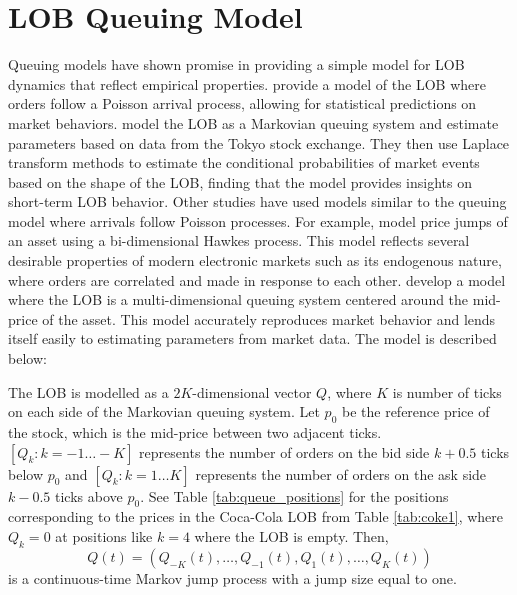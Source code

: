 \section{LOB Queuing Model} \label{modelLOB}
Queuing models have shown promise in providing a simple model for LOB dynamics that reflect empirical properties. \cite{A6a} provide a model of the LOB where orders follow a Poisson arrival process, allowing for statistical predictions on market behaviors. \cite{A6b} model the LOB as a Markovian queuing system and estimate parameters based on data from the Tokyo stock exchange. They then use Laplace transform methods to estimate the conditional probabilities of market events based on the shape of the LOB, finding that the model provides insights on short-term LOB behavior. Other studies have used models similar to the queuing model where arrivals follow Poisson processes. For example, \cite{A9} model price jumps of an asset using a bi-dimensional Hawkes process. This model reflects several desirable properties of modern electronic markets such as its endogenous nature, where orders are correlated and made in response to each other. \cite{A6} develop a model where the LOB is a multi-dimensional queuing system centered around the mid-price of the asset. This model accurately reproduces market behavior and lends itself easily to estimating parameters from market data. The model is described below:

The LOB is modelled as a $2K$-dimensional vector $Q$, where $K$ is number of ticks on each side of the Markovian queuing system. Let $p_0$ be the reference price of the stock, which is the mid-price between two adjacent ticks. $[Q_k: k = -1 \ldots -K]$ represents the number of orders on the bid side $k + 0.5$ ticks below $p_0$ and $[Q_k: k =1 \ldots K]$ represents the number of orders on the ask side $k - 0.5$ ticks above $p_0$. See Table \ref{tab:queue_positions} for the positions corresponding to the prices in the Coca-Cola LOB from Table \ref{tab:coke1}, where $Q_k = 0$ at positions like $k=4$ where the LOB is empty. Then, $$Q(t) = (Q_{-K}(t), \ldots, Q_{-1}(t), Q_1(t), \ldots , Q_K(t))$$ is a continuous-time Markov jump process with a jump size equal to one.

